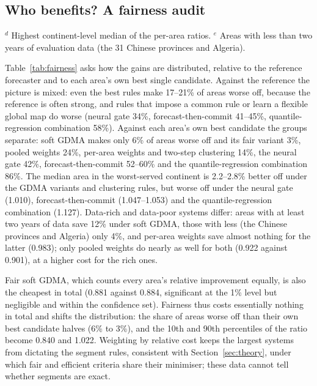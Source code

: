 \subsection{Who benefits? A fairness audit}\label{sec:fairaudit}

\begin{table}[t]
\centering
\caption{Distribution of the benefits across the 125 grid areas ($W=28$, eleven candidates): percentiles of each area's cost relative to the reference forecaster, share of areas made worse off than under the reference and under their own best single candidate, median ratio in the worst-served continent, and cost ratios for data-rich and data-poor areas. Cost ratios and shares: lower is better.}\label{tab:fairness}
\scriptsize
\setlength{\tabcolsep}{3pt}

\par\smallskip\footnotesize $^d$ Highest continent-level median of the per-area ratios. $^e$ Areas with less than two years of evaluation data (the 31 Chinese provinces and Algeria).
\end{table}

Table~\ref{tab:fairness} asks how the gains are distributed, relative to the reference forecaster and to each area's own best single candidate.
Against the reference the picture is mixed: even the best rules make 17--21\% of areas worse off, because the reference is often strong, and rules that impose a common rule or learn a flexible global map do worse (neural gate 34\%, forecast-then-commit 41--45\%, quantile-regression combination 58\%).
Against each area's own best candidate the groups separate: soft GDMA makes only 6\% of areas worse off and its fair variant 3\%, pooled weights 24\%, per-area weights and two-step clustering 14\%, the neural gate 42\%, forecast-then-commit 52--60\% and the quantile-regression combination 86\%.
The median area in the worst-served continent is 2.2--2.8\% better off under the GDMA variants and clustering rules, but worse off under the neural gate (1.010), forecast-then-commit (1.047--1.053) and the quantile-regression combination (1.127).
Data-rich and data-poor systems differ: areas with at least two years of data save 12\% under soft GDMA, those with less (the Chinese provinces and Algeria) only 4\%, and per-area weights save almost nothing for the latter (0.983); only pooled weights do nearly as well for both (0.922 against 0.901), at a higher cost for the rich ones.

Fair soft GDMA, which counts every area's relative improvement equally, is also the cheapest in total (0.881 against 0.884, significant at the 1\% level but negligible and within the confidence set).
Fairness thus costs essentially nothing in total and shifts the distribution: the share of areas worse off than their own best candidate halves (6\% to 3\%), and the 10th and 90th percentiles of the ratio become 0.840 and 1.022.
Weighting by relative cost keeps the largest systems from dictating the segment rules, consistent with Section~\ref{sec:theory}, under which fair and efficient criteria share their minimiser; these data cannot tell whether segments are exact.

